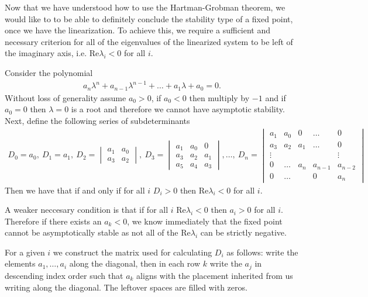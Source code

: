 Now that we have understood how to use the Hartman-Grobman theorem, we would like to to be able to definitely conclude the stability type of a fixed point, once we have the linearization. To achieve this, we require a sufficient and necessary criterion for all of the eigenvalues of the linearized system to be left of the imaginary axis, i.e. $ \textrm{Re} \lambda_i < 0$ for all $i$.

\begin{theorem}
Consider the polynomial
\begin{align}
	a_n \lambda^{n} + a_{n-1} \lambda ^{n-1} + \ldots + a_{1} \lambda + a_0 = 0.
\end{align}
Without loss of generality assume $a_0 > 0$, if $a_0 <0$ then multiply by $-1$ and if $a_0=0$ then $\lambda =0$ is a root and therefore we cannot have asymptotic stability. Next, define the following series of subdeterminants
\begin{align}
	D_0 = a_0,\ D_1 =a_1,\ D_2 =
	\begin{vmatrix}
		a_1 & a_0 \\
		a_3 & a_2
	\end{vmatrix}
	,\ D_3 = 
	\begin{vmatrix}
		a_1 & a_0 & 0 \\
		a_3 & a_2 & a_1 \\
		a_5 & a_4 & a_3
	\end{vmatrix}
	,\ldots,\ D_n =
	\begin{vmatrix}
		a_1 & a_0 & 0 & \ldots & 0 \\
		a_3 & a_2 & a_1 & \ldots & 0 \\
		\vdots & & & & \vdots \\
		0 & \ldots &  a_n & a_{n-1} & a_{n-2}\\
		0 &  \ldots  & & 0  & a_n
	\end{vmatrix}
\end{align}
Then we have that if and only if for all $i$ $D_i >0$ then $ \textrm{Re} \lambda_i <0$ for all $i$.

A weaker neccesary condition is that if for all $i$ $ \textrm{Re} \lambda _i<0$ then $a_i >0$ for all $i$. Therefore if there exists an $a_k<0$, we know immediately that the fixed point cannot be asymptotically stable as not all of the $ \textrm{Re} \lambda _i $ can be strictly negative.
\end{theorem}
\begin{remark}[]
For a given $i$ we construct the matrix used for calculating $D_i$ as follows: write the elements $a_1,\ldots,a_i$ along the diagonal, then in each row $k$ write the $a_j$ in descending index order such that $a_k$ aligns with the placement inherited from us writing along the diagonal. The leftover spaces are filled with zeros. 
\end{remark}

